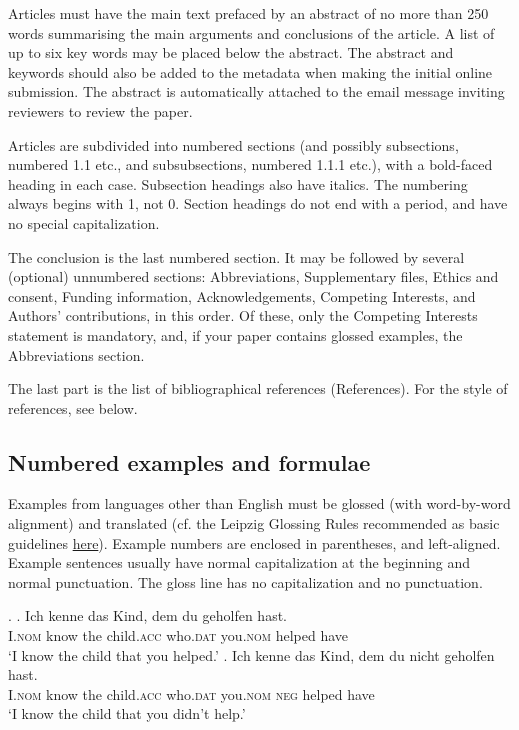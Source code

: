 \documentclass[charis,linguex]{glossa}
\begin{document}
Articles must have the main text prefaced by an abstract of no more than 250 words summarising the main arguments and conclusions of the article. A list of up to six key words may be placed below the abstract. The abstract and keywords should also be added to the metadata when making the initial online submission. The abstract is automatically attached to the email message inviting reviewers to review the paper.

Articles are subdivided into numbered sections (and possibly subsections, numbered 1.1 etc., and subsubsections, numbered 1.1.1 etc.), with a bold-faced heading in each case. Subsection headings also have italics. The numbering always begins with 1, not 0. Section headings do not end with a period, and have no special capitalization.

The conclusion is the last numbered section. It may be followed by several (optional) unnumbered sections: Abbreviations, Supplementary files, Ethics and consent, Funding information,  Acknowledgements, Competing Interests, and Authors' contributions, in this order. Of these, only the Competing Interests statement is mandatory, and, if your paper contains glossed examples, the Abbreviations section.

The last part is the list of bibliographical references (References). For the style of references, see below.

\subsection{Numbered examples and formulae}

Examples from languages other than English must be glossed (with word-by-word alignment) and translated (cf. the Leipzig Glossing Rules recommended as basic guidelines \href{http://www.eva.mpg.de/lingua/resources/glossing-rules.php}{here}). Example numbers are enclosed in parentheses, and left-aligned. Example sentences usually have normal capitalization at the beginning and normal punctuation. The gloss line has no capitalization and no punctuation. 

\ex. \ag. Ich   kenne das Kind, dem du geholfen hast.\\
I.\textsc{nom} know the child.\textsc{acc} who.\textsc{dat} you.\textsc{nom} helped have\\
\glt `I know the child that you helped.'
\bg. Ich kenne das Kind, dem du nicht geholfen hast. \\
I.\textsc{nom} know  the child.\textsc{acc} who.\textsc{dat} you.\textsc{nom} \textsc{neg} helped   have\\
\glt `I know the child that you didn’t help.’
\end{document}
